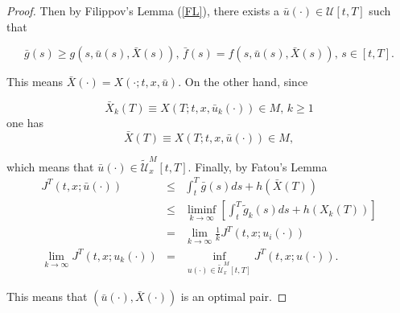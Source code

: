\begin{proof}
Then by Filippov's Lemma (\ref{FL}), there exists a $\bar{u}(\cdot)\in \mathcal{U}[t,T]$ such that

$$\bar{g}(s)\geq g(s,\bar{u}(s),\bar{X}(s)),\,\bar{f}(s)=f(s,\bar{u}(s),\bar{X}(s)),\, s\in [t,T].$$

This means $\bar{X}(\cdot)=X(\cdot;t,x,\bar{u})$. On the other hand, since

$$\bar{X}_k(T)\equiv X(T;t,x,\bar{u}_k(\cdot))\in M,\, k\geq 1$$
one has 
$$\bar{X}(T)\equiv X(T;t,x,\bar{u}(\cdot))\in M,$$

which means that $\bar{u}(\cdot)\in \tilde{\mathcal{U}}^M_x[t,T]$. Finally, by Fatou's Lemma
\begin{eqnarray*}
J^T(t,x;\bar{u}(\cdot))&\leq& \int_{t}^{T}\bar{g}(s)ds +h(\bar{X}(T))\\
&\leq& \liminf_{k\rightarrow \infty}[\int_{t}^{T}\tilde{g}_k(s)ds+h(X_k(T))]\\
&=&\lim_{k\rightarrow \infty} \frac{1}{k}J^T(t,x;u_i(\cdot))\\
\lim_{k\rightarrow \infty} J^T(t,x;u_k(\cdot)) &=& \inf_{u(\cdot)\in\tilde{\mathcal{U}}^M_x[t,T]}J^T(t,x;u(\cdot)).
\end{eqnarray*}

This means that $(\bar{u}(\cdot),\bar{X}(\cdot))$ is an optimal pair.

\end{proof}









